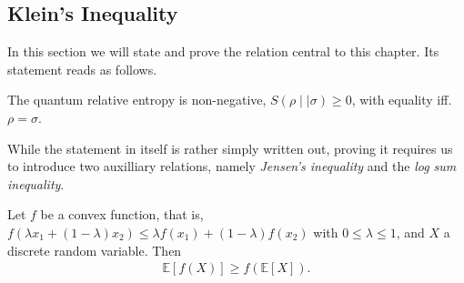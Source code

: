 \subsection{Klein's Inequality}
In this section we will state and prove the relation central to this chapter.
Its statement reads as follows.
\begin{thm}\label{thm:kleins-ineq}
  The quantum relative entropy is non-negative, $S(\rho\mid\mid\sigma)\geq 0$, with equality iff.
  $\rho=\sigma$.
\end{thm}
While the statement in itself is rather simply written out, proving it requires
us to introduce two auxilliary relations, namely \emph{Jensen's inequality} and
the \emph{log sum inequality}.
\begin{thm}\label{thm:jensen}
  Let $f$ be a convex function, that is, $f\left(\lambda x_1 + \left(
  1-\lambda \right)x_2\right) \leq \lambda f\left( x_1 \right) + \left(
  1-\lambda \right) f(x_2)$ with $0\leq\lambda\leq1$, and $X$ a discrete random
  variable. Then
  \begin{align}
    \mathbb{E}\left[f(X)\right] \geq f\left( \mathbb{E}\left[X\right] \right)
  .\end{align}
\end{thm}
